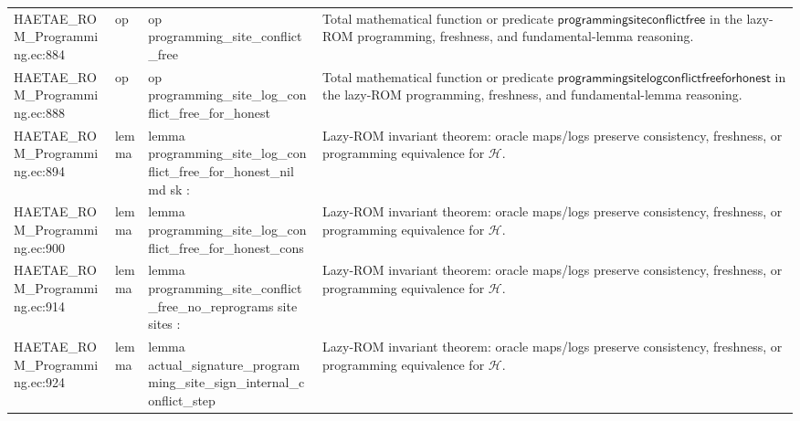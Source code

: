 \documentclass[10pt]{article}
\begin{document}
\begin{longtable}{L{0.11\textwidth}L{0.055\textwidth}L{0.385\textwidth}L{0.41\textwidth}}
HAETAE\_\allowbreak{}ROM\_\allowbreak{}Programming.\allowbreak{}ec:\allowbreak{}884 & op & {\ttfamily\scriptsize op programming\_\allowbreak{}site\_\allowbreak{}conflict\_\allowbreak{}free} & Total mathematical function or predicate $\mathsf{programmingsiteconflictfree}$ in the lazy-ROM programming, freshness, and fundamental-lemma reasoning. \\
HAETAE\_\allowbreak{}ROM\_\allowbreak{}Programming.\allowbreak{}ec:\allowbreak{}888 & op & {\ttfamily\scriptsize op programming\_\allowbreak{}site\_\allowbreak{}log\_\allowbreak{}conflict\_\allowbreak{}free\_\allowbreak{}for\_\allowbreak{}honest} & Total mathematical function or predicate $\mathsf{programmingsitelogconflictfreeforhonest}$ in the lazy-ROM programming, freshness, and fundamental-lemma reasoning. \\
HAETAE\_\allowbreak{}ROM\_\allowbreak{}Programming.\allowbreak{}ec:\allowbreak{}894 & lemma & {\ttfamily\scriptsize lemma programming\_\allowbreak{}site\_\allowbreak{}log\_\allowbreak{}conflict\_\allowbreak{}free\_\allowbreak{}for\_\allowbreak{}honest\_\allowbreak{}nil md sk :} & Lazy-ROM invariant theorem: oracle maps/logs preserve consistency, freshness, or programming equivalence for $\mathcal H$. \\
HAETAE\_\allowbreak{}ROM\_\allowbreak{}Programming.\allowbreak{}ec:\allowbreak{}900 & lemma & {\ttfamily\scriptsize lemma programming\_\allowbreak{}site\_\allowbreak{}log\_\allowbreak{}conflict\_\allowbreak{}free\_\allowbreak{}for\_\allowbreak{}honest\_\allowbreak{}cons} & Lazy-ROM invariant theorem: oracle maps/logs preserve consistency, freshness, or programming equivalence for $\mathcal H$. \\
HAETAE\_\allowbreak{}ROM\_\allowbreak{}Programming.\allowbreak{}ec:\allowbreak{}914 & lemma & {\ttfamily\scriptsize lemma programming\_\allowbreak{}site\_\allowbreak{}conflict\_\allowbreak{}free\_\allowbreak{}no\_\allowbreak{}reprograms site sites :} & Lazy-ROM invariant theorem: oracle maps/logs preserve consistency, freshness, or programming equivalence for $\mathcal H$. \\
HAETAE\_\allowbreak{}ROM\_\allowbreak{}Programming.\allowbreak{}ec:\allowbreak{}924 & lemma & {\ttfamily\scriptsize lemma actual\_\allowbreak{}signature\_\allowbreak{}programming\_\allowbreak{}site\_\allowbreak{}sign\_\allowbreak{}internal\_\allowbreak{}conflict\_\allowbreak{}step} & Lazy-ROM invariant theorem: oracle maps/logs preserve consistency, freshness, or programming equivalence for $\mathcal H$. \\

\end{longtable}
\end{document}
